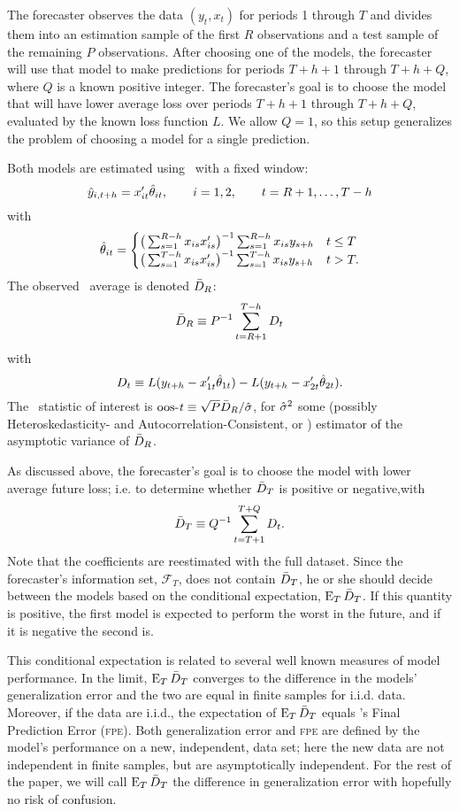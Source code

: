 \documentclass[11pt]{article}
\newcommand{\citepos}[1]{\citeauthor{#1}'s \citeyearpar{#1}}
\begin{document}
The forecaster observes the data $(y_t,x_t)$ for periods 1 through $T$
and divides them into an estimation sample of the first $R$
observations and a test sample of the remaining $P$ observations.
After choosing one of the models, the forecaster will use that model
to make predictions for periods $T + h + 1$ through $T + h + Q$, where
$Q$ is a known positive integer.  The forecaster's goal is to choose
the model that will have lower average loss over periods $T+h+1$ through
$T+h+Q$, evaluated by the known loss function $L$.  We allow $Q = 1$,
so this setup generalizes the problem of choosing a model for a single
prediction.

Both models are estimated using \ols\ with a fixed window:
\[
\hat y_{i,t+h} = x_{it}'\hat{\theta}_{it}, \qquad i=1,2, \qquad t
= R+1,\dots,T-h
\]
with
\begin{equation*}
  \hat\theta_{it} =
  \begin{cases}
    \big(\sum_{s=1}^{R-h} x_{is}x_{is}'\big)^{-1} \sum_{s=1}^{R-h}
    x_{is} y_{s+h} & t \leq T \\
    \big(\sum_{s=1}^{T-h} x_{is}x_{is}'\big)^{-1}
    \sum_{s=1}^{T-h} x_{is} y_{s+h} & t > T.
  \end{cases}
\end{equation*}
The observed \oos\ average is denoted $\bar{D}_{R}$: \[\bar{D}_{R} \equiv P^{-1}
\sum_{t=R+1}^{T-h} D_t\]  with
\[
D_t \equiv L(y_{t+h} - x_{1t}'\hat\theta_{1t}) - L(y_{t+h} - x_{2t}'\hat\theta_{2t}).
\]
The \oos\ statistic of interest is $\operatorname{oos-\mathit{t}} \equiv \sqrt{P} \bar{D}_{R} /
\hat{\sigma}$, for $\hat{\sigma}^2$ some (possibly Heteroskedasticity- and
Autocorrelation-Consistent, or \hac) estimator of the asymptotic
variance of $\bar{D}_{R}$.

As discussed above, the forecaster's goal is to choose the model with
lower average future loss; i.e. to determine whether $\bar{D}_{T}$ is
positive or negative,with
\[
\bar{D}_{T} \equiv Q^{-1} \sum_{t=T+1}^{T+Q} D_t.
\]
Note that the coefficients are reestimated with the full dataset.
Since the forecaster's information set, $\mathcal{F}_T$, does not
contain $\bar{D}_{T}$, he or she should decide between the models based on
the conditional expectation, $\operatorname{E}_T \bar{D}_{T}$. If this quantity is
positive, the first model is expected to perform the worst in the
future, and if it is negative the second is.

This conditional expectation is related to several well known measures
of model performance.  In the limit, $\operatorname{E}_{T} \bar{D}_{T}$ converges to
the difference in the models' generalization error and the two are
equal in finite samples for i.i.d. data.  Moreover, if the data are
i.i.d., the expectation of $\operatorname{E}_T \bar{D}_{T}$ equals \citepos{Aka:69} Final
Prediction Error (\textsc{fpe}).  Both generalization error and
\textsc{fpe} are defined by the model's performance on a new,
independent, data set; here the new data are not independent in finite
samples, but are asymptotically independent.  For the rest of the
paper, we will call $\operatorname{E}_T \bar{D}_{T}$ the difference in generalization
error with hopefully no risk of confusion.
\end{document}

